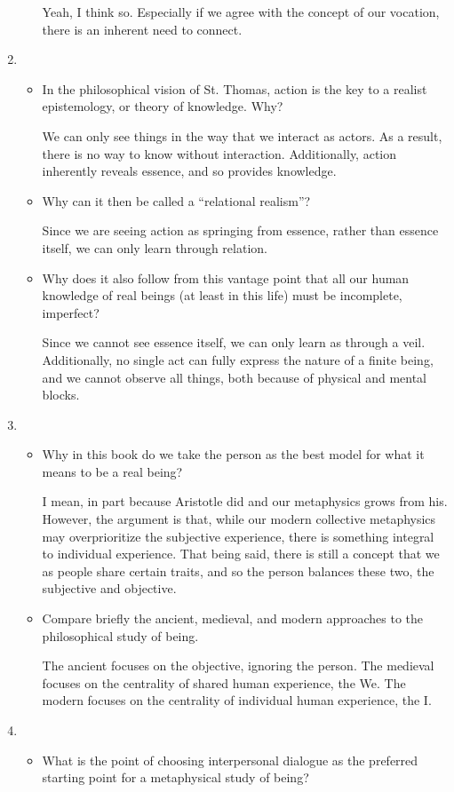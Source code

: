 \documentclass[12pt]{article}[titlepage]
\newcommand{\say}[1]{``#1''}
\newcommand{\1}{\={a}}
\newcommand{\2}{\={e}}
\newcommand{\3}{\={\i}}
\newcommand{\4}{\=o}
\newcommand{\5}{\=u}
\newcommand{\6}{\={A}}
\renewcommand{\,}{\textsuperscript{,}}
\begin{document}
\begin{enumerate}
\begin{itemize}
Yeah, I think so.
Especially if we agree with the concept of our vocation, there is an inherent need to connect.
\end{itemize}
\item \begin{itemize}
\item In the philosophical vision of St. Thomas, action is the key to a realist epistemology, or theory of knowledge.
Why?

We can only see things in the way that we interact as actors.
As a result, there is no way to know without interaction.
Additionally, action inherently reveals essence, and so provides knowledge.
\item Why can it then be called a \say{relational realism}?

Since we are seeing action as springing from essence, rather than essence itself, we can only learn through relation.
\item Why does it also follow from this vantage point that all our human knowledge of real beings (at least in this life) must be incomplete, imperfect?

Since we cannot see essence itself, we can only learn as through a veil.
Additionally, no single act can fully express the nature of a finite being, and we cannot observe all things, both because of physical and mental blocks.
\end{itemize}
\item \begin{itemize}
\item Why in this book do we take the person as the best model for what it means to be a real being?

I mean, in part because Aristotle did and our metaphysics grows from his.
However, the argument is that, while our modern collective metaphysics may overprioritize the subjective experience, there is something integral to individual experience.
That being said, there is still a concept that we as people share certain traits, and so the person balances these two, the subjective and objective.
\item Compare briefly the ancient, medieval, and modern approaches to the philosophical study of being.

The ancient focuses on the objective, ignoring the person.
The medieval focuses on the centrality of shared human experience, the We.
The modern focuses on the centrality of individual human experience, the I.
\end{itemize}
\item \begin{itemize}
\item What is the point of choosing interpersonal dialogue as the preferred starting point for a metaphysical study of being?


\end{itemize}
\end{enumerate}
\end{document}
